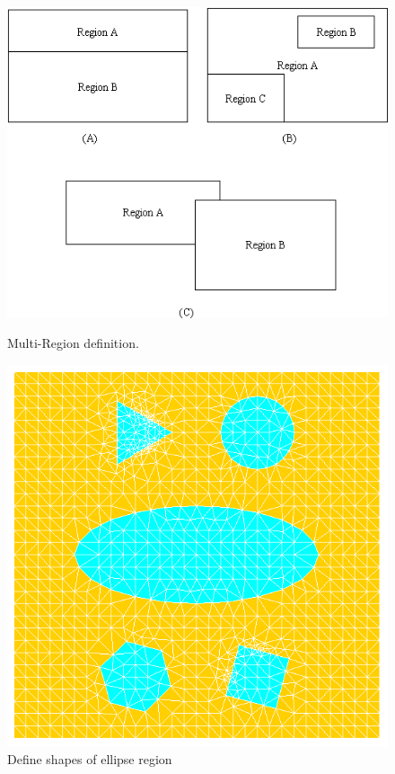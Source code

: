 \documentclass[11pt,pdftex]{article}
\begin{document}
\begin{figure}[ht]
  \hfill
  \begin{minipage}[t]{.5\textwidth}
    \begin{center}
      \includegraphics[scale=0.6]{r1.png}
      \caption{Multi-Region definition.}\label{Region1}
    \end{center}
  \end{minipage}
  \hfill
  \begin{minipage}[t]{.45\textwidth}
    \begin{center}
      \includegraphics[scale=0.3]{region.png}
      \caption{Define shapes of ellipse region}\label{Region2}
    \end{center}
  \end{minipage}
  \hfill
\end{figure}
\end{document}
